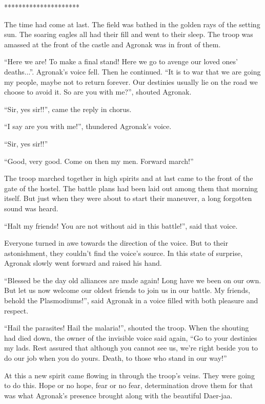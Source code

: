 \documentclass[twoside,11pt]{article}
\begin{document}
\bigskip
\begin{center}
*********************
\end{center}

The time had come at last. The field was bathed in the golden rays of the setting sun. The soaring eagles all had their fill and went to their sleep. The troop was amassed at the front of the castle and Agronak was in front of them.

``Here we are! To make a final stand! Here we go to avenge our loved ones' deaths...''. Agronak's voice fell. Then he continued. ``It is to war that we are going my people, maybe not to return forever. Our destinies usually lie on the road we choose to avoid it. So are you with me?'', shouted Agronak.

``Sir, yes sir!!'', came the reply in chorus.

``I say are you with me!'', thundered Agronak's voice.

``Sir, yes sir!!''

``Good, very good. Come on then my men. Forward march!''

The troop marched together in high spirits and at last came to the front of the gate of the hostel. The battle plans had been laid out among them that morning itself. But just when they were about to start their maneuver, a long forgotten sound was heard.

``Halt my friends! You are not without aid in this battle!'', said that voice.

Everyone turned in awe towards the direction of the voice. But to their astonishment, they couldn't find the voice's source. In this state of surprise, Agronak slowly went forward and raised his hand.

``Blessed be the day old alliances are made again! Long have we been on our own. But let us now welcome our oldest friends to join us in our battle. My friends, behold the Plasmodiums!'', said Agronak in a voice filled with both pleasure and respect.

``Hail the parasites! Hail the malaria!'', shouted the troop. When the shouting had died down, the owner of the invisible voice said again, ``Go to your destinies my lads. Rest assured that although you cannot see us, we're right beside you to do our job when you do yours. Death, to those who stand in our way!''

At this a new spirit came flowing in through the troop's veins. They were going to do this. Hope or no hope, fear or no fear, determination drove them for that was what Agronak's presence brought along with the beautiful Daer-jaa.
\end{document}
